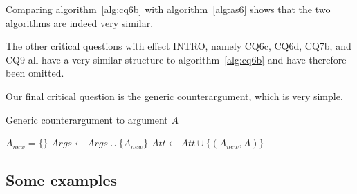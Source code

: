 \rationale{} Comparing algorithm~\ref{alg:cq6b} with algorithm~\ref{alg:as6} shows that the two algorithms are indeed very similar. 

The other critical questions with effect INTRO, namely CQ6c, CQ6d, CQ7b, and CQ9 all have a very similar structure to algorithm~\ref{alg:cq6b} and have therefore been omitted.

Our final critical question is the generic counterargument, which is very simple.

\begin{algorithm}[h]
  \caption{Generic counterargument to argument $A$}\label{alg:cq6b}
  \begin{algorithmic}[1]
    \State $A_{new} = \{\}$
    \State $Args \gets Args \cup \{A_{new}\}$
    \State $Att \gets Att \cup \{(A_{new},A)\}$
    \EndProcedure
  \end{algorithmic}
\end{algorithm}

\subsection{Some examples}


